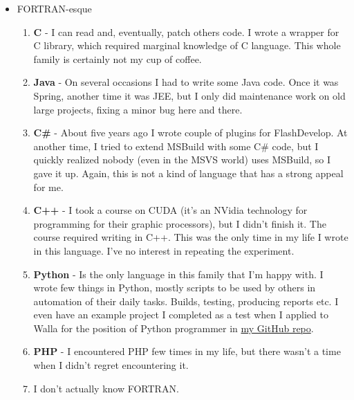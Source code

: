\documentclass[oneside]{memoir}
\begin{document}
\begin{itemize}
\item FORTRAN-esque
\begin{enumerate}
\item \textbf{C} - I can read and, eventually, patch others code.  I wrote a wrapper
for C library, which required marginal knowledge of C language.  This
whole family is certainly not my cup of coffee.
\item \textbf{Java} - On several occasions I had to write some Java code.  Once it was
Spring, another time it was JEE, but I only did maintenance work on old
large projects, fixing a minor bug here and there.
\item \textbf{C\#} - About five years ago I wrote couple of plugins for FlashDevelop.
At another time, I tried to extend MSBuild with some C\# code, but I
quickly realized nobody (even in the MSVS world) uses MSBuild, so I gave
it up.  Again, this is not a kind of language that has a strong appeal
for me.
\item \textbf{C++} - I took a course on CUDA (it's an NVidia technology for programming
for their graphic processors), but I didn't finish it.  The course
required writing in C++.  This was the only time in my life I wrote in
this language.  I've no interest in repeating the experiment.
\item \textbf{Python} - Is the only language in this family that I'm happy with.  I
wrote few things in Python, mostly scripts to be used by others in
automation of their daily tasks.  Builds, testing, producing reports etc.
I even have an example project I completed as a test when I applied to
Walla for the position of Python programmer in \href{https://github.com/wvxvw?tab%3Drepositories}{my GitHub repo}.
\item \textbf{PHP} - I encountered PHP few times in my life, but there wasn't a time
when I didn't regret encountering it.
\item I don't actually know FORTRAN.
\end{enumerate}


\end{itemize}
\end{document}
